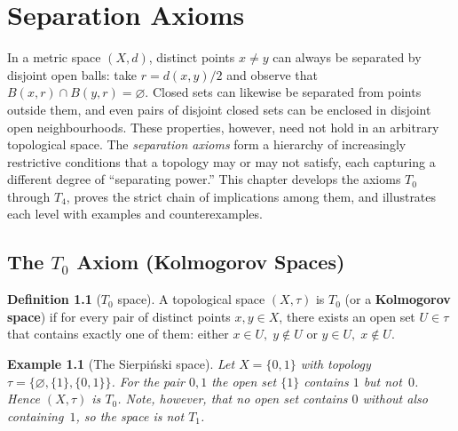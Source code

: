 \documentclass[11pt,a4paper,twoside]{book}
\theoremstyle{remark}
\theoremstyle{definition}
\newtheorem{exampleplain}[theorem]{Example}
\theoremstyle{definition}
\newtheorem{definition}{Definition}[section]
\newenvironment{example}[1][]{%
  \begin{exampleplain}[#1]\itshape
}{%
  \end{exampleplain}
}
\begin{document}

\chapter{Separation Axioms}\label{ch:separation-axioms}

In a metric space $(X,d)$, distinct points $x \neq y$ can always be separated
by disjoint open balls: take $r = d(x,y)/2$ and observe that
$B(x,r) \cap B(y,r) = \varnothing$.  Closed sets can likewise be separated
from points outside them, and even pairs of disjoint closed sets can be
enclosed in disjoint open neighbourhoods.  These properties, however, need not
hold in an arbitrary topological space.  The \emph{separation axioms} form a
hierarchy of increasingly restrictive conditions that a topology may or may not
satisfy, each capturing a different degree of ``separating power.''  This
chapter develops the axioms $T_0$ through $T_4$, proves the strict chain of
implications among them, and illustrates each level with examples and
counterexamples.

\section{The \texorpdfstring{$T_0$}{T0} Axiom (Kolmogorov Spaces)}
\label{sec:T0}

\begin{definition}[$T_0$ space]\label{def:T0}
A topological space $(X,\tau)$ is \textbf{$T_0$} (or a \textbf{Kolmogorov
space}) if for every pair of distinct points
$x, y \in X$, there exists an open set $U \in \tau$ that contains exactly one
of them: either $x \in U,\; y \notin U$ or $y \in U,\; x \notin U$.
\end{definition}

\begin{example}[The Sierpi\'nski space]\label{ex:sierpinski-T0}
Let $X = \{0,1\}$ with topology $\tau = \{\varnothing, \{1\}, \{0,1\}\}$.
For the pair $0,1$ the open set $\{1\}$ contains $1$ but not~$0$.
Hence $(X,\tau)$ is $T_0$.  Note, however, that no open set contains $0$
without also containing~$1$, so the space is \emph{not} $T_1$.
\end{example}
\end{document}
